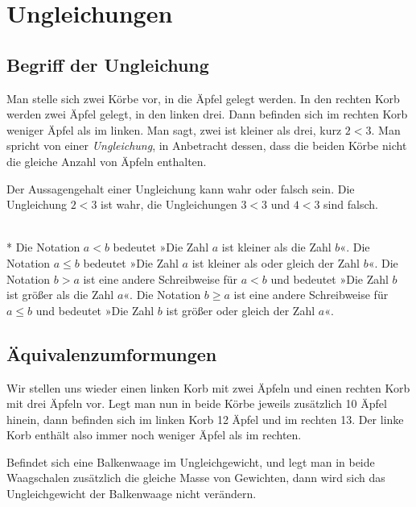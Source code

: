 \noindent


\newpage
\section{Ungleichungen}

\subsection{Begriff der Ungleichung}%

Man stelle sich zwei Körbe vor, in die Äpfel gelegt werden.
In den rechten Korb werden zwei Äpfel gelegt, in den linken drei.
Dann befinden sich im rechten Korb weniger Äpfel als im linken.
Man sagt, zwei ist kleiner als drei, kurz $2<3$. Man spricht von
einer \emph{Ungleichung}, in Anbetracht dessen, dass die beiden
Körbe nicht die gleiche Anzahl von Äpfeln enthalten.

Der Aussagengehalt einer Ungleichung kann wahr oder falsch sein.
Die Ungleichung $2<3$ ist wahr, die Ungleichungen $3<3$ und
$4<3$ sind falsch.

\begin{Definition}[Ungleichungsrelation]\mbox{}\\*
Die Notation $a<b$ bedeutet »Die Zahl $a$ ist kleiner als
die Zahl $b$«. Die Notation $a\le b$ bedeutet »Die Zahl $a$
ist kleiner als oder gleich der Zahl $b$«. Die Notation
$b>a$ ist eine andere Schreibweise für $a<b$ und bedeutet
»Die Zahl $b$ ist größer als die Zahl $a$«. Die Notation
$b\ge a$ ist eine andere Schreibweise für $a\le b$ und
bedeutet »Die Zahl $b$ ist größer oder gleich der Zahl $a$«.
\end{Definition}

\subsection{Äquivalenzumformungen}%

Wir stellen uns wieder einen linken Korb mit zwei Äpfeln und
einen rechten Korb mit drei Äpfeln vor. Legt man nun in beide
Körbe jeweils zusätzlich 10 Äpfel hinein, dann befinden sich
im linken Korb 12 Äpfel und im rechten 13. Der linke Korb
enthält also immer noch weniger Äpfel als im rechten.

Befindet sich eine Balkenwaage im Ungleichgewicht, und legt man
in beide Waagschalen zusätzlich die gleiche Masse von Gewichten,
dann wird sich das Ungleichgewicht der Balkenwaage nicht verändern.

